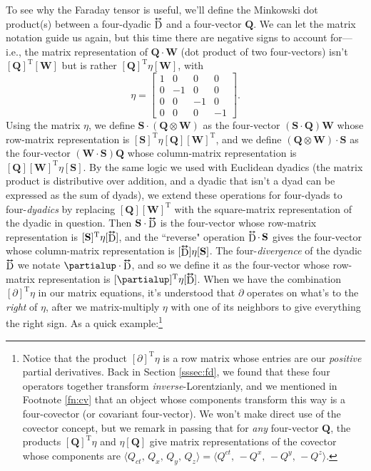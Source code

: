\documentclass[12pt]{article}
\renewcommand{\vv}[1]{\mathbf{#1}}
\newcommand{\tightoverset}[2]{%
  \mathop{#2}\limits^{\vbox to -.5ex{\kern-0.75ex\hbox{$#1$}\vss}}}
\newcommand{\inlinedy}[1]{\tightoverset{\text{\tiny$\bm\leftrightarrow$}}{#1}}
\begin{document}
To see why the Faraday tensor is useful, we'll define the Minkowski dot product(s) between a four-dyadic $\inlinedy{\mathrm{D}}$ and a four-vector $\vv Q$. We can let the matrix notation guide us again, but this time there are negative signs to account for---i.e., the matrix representation of $\vv Q \cdot \vv W$ (dot product of two four-vectors) isn't $[\vv Q]^{\textrm{T}} [\vv W]$ but is rather $[\vv Q]^{\textrm{T}} \eta [\vv W]$, with
\begin{equation}\label{eq:mmt}
\eta
=
\begin{bmatrix}
1 & 0 & 0 & 0 \\
0 & -1 & 0 & 0 \\
0 & 0 & -1 & 0 \\
0 & 0 & 0 & -1
\end{bmatrix} .
\end{equation}
Using the matrix $\eta$, we define $\vv S \cdot (\vv Q \otimes \vv W)$ as the four-vector $(\vv S \cdot \vv Q) \vv W$ whose row-matrix representation is $[\vv S]^\mathrm{T} \eta [\vv Q] [\vv W]^\mathrm{T}$, and we define $(\vv Q \otimes \vv W) \cdot \vv S$ as the four-vector $(\vv W \cdot \vv S) \vv Q$ whose column-matrix representation is $[\vv Q] [\vv W]^\mathrm{T} \eta [\vv S]$. By the same logic we used with Euclidean dyadics (the matrix product is distributive over addition, and a dyadic that isn't a dyad can be expressed as the sum of dyads), we extend these operations for four-dyads to four-\emph{dyadics} by replacing $[\vv Q][\vv W]^{\textrm{T}}$ with the square-matrix representation of the dyadic in question. Then $\vv S \cdot \inlinedy{\mathrm{D}}$ is the four-vector whose row-matrix representation is $[\vv S]^{\mathrm{T}} \eta [\inlinedy{\mathrm{D}}]$, and the ``reverse" operation $\inlinedy{\mathrm{D}} \cdot \, \vv S$ gives the four-vector whose column-matrix representation is $[\inlinedy{\mathrm{D}}] \eta [\vv S]$. The four-\emph{divergence} of the dyadic $\inlinedy{\mathrm{D}}$ we notate $\partialup \cdot \inlinedy{\mathrm{D}}$, and so we define it as the four-vector whose row-matrix representation is $[\partialup]^{\mathrm{T}} \eta [\inlinedy{\mathrm{D}}]$. When we have the combination $[\partialup]^\mathrm{T} \eta$ in our matrix equations, it's understood that $\partialup$ operates on what's to the \emph{right} of $\eta$, after we matrix-multiply $\eta$ with one of its neighbors to give everything the right sign. As a quick example:\footnote{Notice that the product $[\partialup]^\mathrm{T} \eta$ is a row matrix whose entries are our \emph{positive} partial derivatives. Back in Section \ref{sssec:fd}, we found that these four operators together transform \emph{inverse}-Lorentzianly, and we mentioned in Footnote \ref{fn:cv} that an object whose components transform this way is a four-covector (or covariant four-vector). We won't make direct use of the covector concept, but we remark in passing that for \emph{any} four-vector $\vv Q$, the products $[\vv Q]^\mathrm{T} \eta$ and $\eta [\vv Q]$ give matrix representations of the covector whose components are $\langle Q_{ct}, \, Q_x, \, Q_y, \, Q_z \rangle = \langle Q^{ct}, \, -Q^x, \, -Q^y, \, -Q^z \rangle$.}
\end{document}
